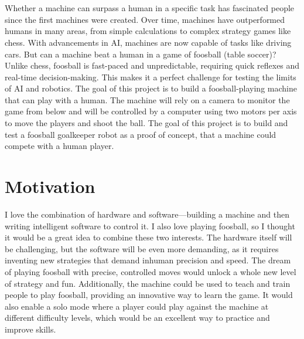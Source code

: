 \section*{~}
Whether a machine can surpass a human in a specific task has fascinated people since the first machines were created.
Over time, machines have outperformed humans in many areas, from simple calculations to complex strategy games like chess.
With advancements in AI, machines are now capable of tasks like driving cars.
But can a machine beat a human in a game of foosball (table soccer)?
Unlike chess, foosball is fast-paced and unpredictable, requiring quick reflexes and real-time decision-making.
This makes it a perfect challenge for testing the limits of AI and robotics.
The goal of this project is to build a foosball-playing machine that can play with a human.
The machine will rely on a camera to monitor the game from below and will be controlled by a computer using two motors per axis to move the players and shoot the ball.
The goal of this project is to build and test a foosball goalkeeper robot as a proof of concept, that a machine could compete with a human player.

\section{Motivation}\label{sec:motivation}
I love the combination of hardware and software—building a machine and then writing intelligent software to control it.
I also love playing foosball, so I thought it would be a great idea to combine these two interests.
The hardware itself will be challenging, but the software will be even more demanding, as it requires inventing new strategies that demand inhuman precision and speed.
The dream of playing foosball with precise, controlled moves would unlock a whole new level of strategy and fun.
Additionally, the machine could be used to teach and train people to play foosball, providing an innovative way to learn the game.
It would also enable a solo mode where a player could play against the machine at different difficulty levels, which would be an excellent way to practice and improve skills.
